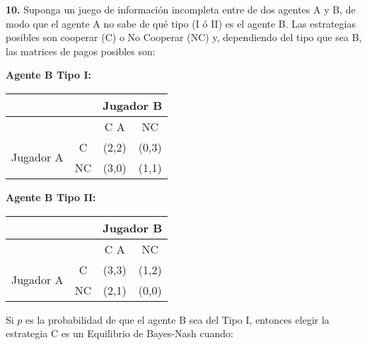 \documentclass{nuevotema}
\begin{document}
\textbf{10.} Suponga un juego de información incompleta entre de dos agentes A y B, de modo que el agente A no sabe de qué tipo (I ó II) es el agente B. Las estrategias posibles son cooperar (C) o No Cooperar (NC) y, dependiendo del tipo que sea B, las matrices de pagos posibles son:

\medskip 

\begin{center}
	
	\textbf{Agente B Tipo I:}
	
	
	\begin{tabular}{c  c  c  c}
		
		& & \multicolumn{2}{c}{Jugador B}\\ \hline
		
		& & C A & NC\\ \hline
		
		
		\multirow{2}{*}{Jugador A}& C & (2,2) & (0,3) \\
		& NC & (3,0) & (1,1) \\ \hline
		
	\end{tabular}
	
\end{center}

\bigskip

\begin{center}
	
\textbf{Agente B Tipo II:}


	\begin{tabular}{c  c  c  c}
		
		& & \multicolumn{2}{c}{Jugador B}\\ \hline
		
		& & C A & NC\\ \hline
		
		
		\multirow{2}{*}{Jugador A}& C & (3,3) & (1,2) \\
		& NC & (2,1) & (0,0) \\ \hline
		
	\end{tabular}
	
\end{center}


\medskip 

Si $p$ es la probabilidad de que el agente B sea del Tipo I, entonces elegir la estrategia C es un Equilibrio de Bayes-Nash cuando:
\end{document}
